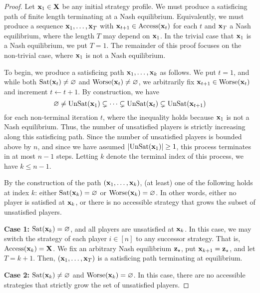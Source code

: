 \begin{proof}
Let ${\mathbf{x}}_1 \in {\mathbf{X}}$ be any initial strategy profile. We must produce a satisficing path of finite length terminating at a Nash equilibrium. Equivalently, we must produce a sequence ${\mathbf{x}}_1, \dots, {\mathbf{x}}_T$ with ${\mathbf{x}}_{t+1} \in {\rm Access} ({\mathbf{x}}_t )$ for each $t$ and ${\mathbf{x}}_T$ a Nash equilibrium, where the length $T$ may depend on ${\mathbf{x}}_1$. In the trivial case that ${\mathbf{x}}_1$ is a Nash equilibrium, we put $T=1$. The remainder of this proof focuses on the non-trivial case, where ${\mathbf{x}}_1$ is not a Nash equilibrium. 

To begin, we produce a satisficing path ${\mathbf{x}}_1, \dots, {\mathbf{x}}_k$ as follows. We put $t = 1$, and while both ${\rm Sat}({\mathbf{x}}_t) \not= \varnothing$ and ${\rm Worse}({\mathbf{x}}_t) \not= \varnothing$, we arbitrarily fix ${\mathbf{x}}_{t+1} \in {\rm Worse}({\mathbf{x}}_t)$ and increment $t \gets t+1$. By construction, we have 
\[
\varnothing \not= {\rm UnSat}({\mathbf{x}}_1) \subsetneq \cdots \subsetneq {\rm UnSat}({\mathbf{x}}_t) \subsetneq {\rm UnSat}({\mathbf{x}}_{t+1})
\]
for each non-terminal iteration $t$, where the inequality holds because ${\mathbf{x}}_1$ is not a Nash equilibrium. Thus, the number of unsatisfied players is strictly increasing along this satisficing path. Since the number of unsatisfied players is bounded above by $n$, and since we have assumed $| {\rm UnSat}({\mathbf{x}}_1) | \geq 1$, this process terminates in at most $n-1$ steps. Letting $k$ denote the terminal index of this process, we have $k \leq n-1$. 


By the construction of the path $({\mathbf{x}}_1, \dots, {\mathbf{x}}_k)$, (at least) one of the following holds at index $k$: either ${\rm Sat}({\mathbf{x}}_k) = \varnothing$ or ${\rm Worse}({\mathbf{x}}_k) = \varnothing$. In other words, either no player is satisfied at ${\mathbf{x}}_k$, or there is no accessible strategy that grows the subset of unsatisfied players. %

\noindent \textbf{Case 1:} ${\rm Sat}({\mathbf{x}}_k) = \varnothing$, and all players are unsatisfied at ${\mathbf{x}}_k$. In this case, we may switch the strategy of each player $i \in [n]$ to any successor strategy. That is, ${\rm Access}({\mathbf{x}}_k) = {\mathbf{X}}$. We fix an arbitrary Nash equilibrium ${\mathbf{z}}_{\star}$, put ${\mathbf{x}}_{k+1} = {\mathbf{z}}_{\star}$, and let $T = k+1$. Then, $({\mathbf{x}}_1, \dots, {\mathbf{x}}_{T})$ is a satisficing path terminating at equilibrium.

\noindent \textbf{Case 2:} ${\rm Sat}({\mathbf{x}}_k)\not= \varnothing$ and ${\rm Worse}({\mathbf{x}}_k) = \varnothing$. In this case, there are no accessible strategies that strictly grow the set of unsatisfied players. %


\end{proof}
